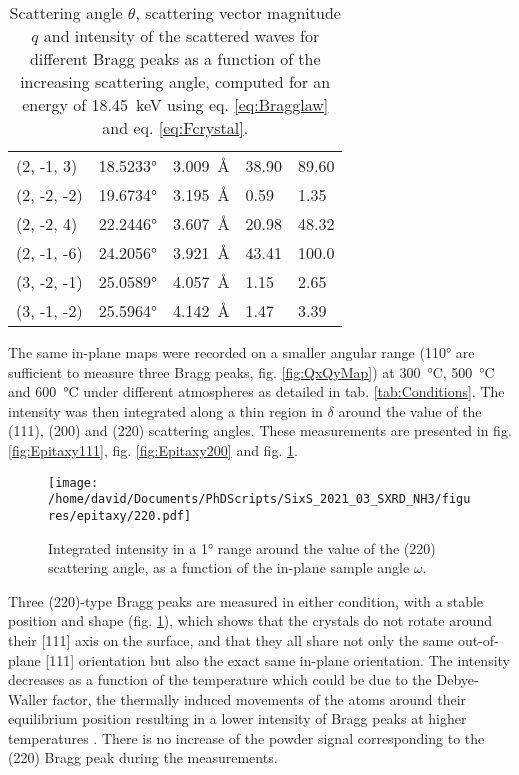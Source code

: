 \begin{table}[htb!]
\begin{minipage}{.45\linewidth}
\begin{tabular}{@{}lllll@{}}
        (2, -1, 3)   & \ang{18.5233} & \qty{3.009}{\angstrom} & \num{38.90} & \num{89.60} \\
        (2, -2, -2)  & \ang{19.6734} & \qty{3.195}{\angstrom} & \num{0.59}  & \num{1.35}  \\
        (2, -2, 4)   & \ang{22.2446} & \qty{3.607}{\angstrom} & \num{20.98} & \num{48.32} \\
        (2, -1, -6)  & \ang{24.2056} & \qty{3.921}{\angstrom} & \num{43.41} & \num{100.0} \\
        (3, -2, -1)  & \ang{25.0589} & \qty{4.057}{\angstrom} & \num{1.15}  & \num{2.65}  \\
        (3, -1, -2)  & \ang{25.5964} & \qty{4.142}{\angstrom} & \num{1.47}  & \num{3.39}  \\
        \bottomrule
        \end{tabular}%
    \end{minipage}%
    \caption{
        Scattering angle $\theta$, scattering vector magnitude $q$ and intensity of the scattered waves for different Bragg peaks as a function of the increasing scattering angle, computed for an energy of \qty{18.45}{\keV} using eq. \ref{eq:Bragglaw} and eq. \ref{eq:Fcrystal}.
    }
    \label{tab:Reflections}
\end{table}

The same in-plane maps were recorded on a smaller angular range (\ang{110} are sufficient to measure three Bragg peaks, fig. \ref{fig:QxQyMap}) at \qty{300}{\degreeCelsius}, \qty{500}{\degreeCelsius} and \qty{600}{\degreeCelsius} under different atmospheres as detailed in tab. \ref{tab:Conditions}.
The intensity was then integrated along a thin region in $\delta$ around the value of the (111), (200) and (220) scattering angles.
These measurements are presented in fig. \ref{fig:Epitaxy111}, fig. \ref{fig:Epitaxy200} and fig. \ref{fig:Epitaxy220}.

\begin{figure}[!htb]
    \centering
    \texttt{[image: /home/david/Documents/PhDScripts/SixS\_2021\_03\_SXRD\_NH3/figures/epitaxy/220.pdf]}
    \caption{
        Integrated intensity in a \ang{1} range around the value of the (220) scattering angle, as a function of the in-plane sample angle $\omega$.
    }
    \label{fig:Epitaxy220}
\end{figure}

Three (220)-type Bragg peaks are measured in either condition, with a stable position and shape (fig. \ref{fig:Epitaxy220}), which shows that the crystals do not rotate around their [111] axis on the surface, and that they all share not only the same out-of-plane [111] orientation but also the exact same in-plane orientation.
The intensity decreases as a function of the temperature which could be due to the Debye-Waller factor, the thermally induced movements of the atoms around their equilibrium position resulting in a lower intensity of Bragg peaks at higher temperatures \parencite{Willmott}.
There is no increase of the powder signal corresponding to the (220) Bragg peak during the measurements.

